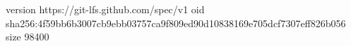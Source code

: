 version https://git-lfs.github.com/spec/v1
oid sha256:4f59bb6b3007cb9ebb03757ca9f809ed90d10838169e705dcf7307eff826b056
size 98400
